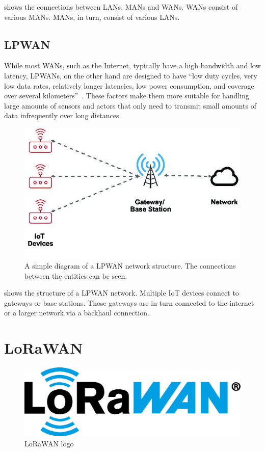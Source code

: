  shows the connections between \acfp{LAN}, \acfp{MAN} and \acfp{WAN}.
\acp{WAN} consist of various \acp{MAN}.
\acp{MAN}, in turn, consist of various \acp{LAN}.

\subsection{\acf{LPWAN}}

While most \acp{WAN}, such as the Internet, typically have a high bandwidth and low latency, \acp{LPWAN}, on the other hand are designed to have ``low duty cycles, very low data rates, relatively longer latencies, low power consumption, and coverage over several kilometers''~\cite[p. 289]{kumar_connecting_2023}.
These factors make them more suitable for handling large amounts of sensors and actors that only need to transmit small amounts of data infrequently over long distances.

\begin{figure}[htbp]
    \centering
    \includegraphics[width=.5\textwidth]{pictures/lorawan-structure/lpwan_network_structure.jpg}
    \caption{
        A simple diagram of a \ac{LPWAN} network structure.
        The connections between the entities can be seen.\protect\cite{fernandez_assessing_2020}
    }\label{pic:lpwan-diagram}
\end{figure}

 shows the structure of a \ac{LPWAN} network.
Multiple \ac{IoT} devices connect to gateways or base stations.
Those gateways are in turn connected to the internet or a larger network via a backhaul connection.

\section{\acf{LoRaWAN}}\label{sec:lorawan}

\begin{figure}[htbp]
    \centering
    \includegraphics[width=.3\textwidth]{pictures/logos/LoRaWAN_Logo.eps}
    \caption{
        \ac{LoRaWAN} logo~\protect\cite{lora_alliance_francais_2022}
    }
\end{figure}

